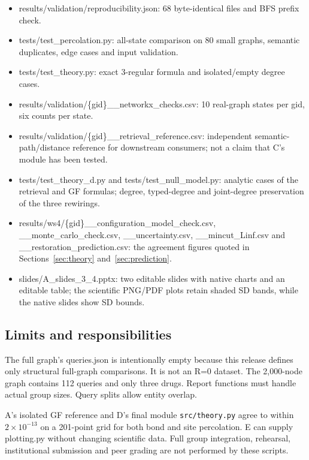 \begin{itemize}
\tightlist
\item
  results/validation/reproducibility.json: 68 byte-identical files and
  BFS prefix check.
\item
  tests/test\_percolation.py: all-state comparison on 80 small graphs,
  semantic duplicates, edge cases and input validation.
\item
  tests/test\_theory.py: exact 3-regular formula and isolated/empty
  degree cases.
\item
  results/validation/\{gid\}\_\_networkx\_checks.csv: 10 real-graph
  states per gid, six counts per state.
\item
  results/validation/\{gid\}\_\_retrieval\_reference.csv: independent
  semantic-path/distance reference for downstream consumers; not a claim
  that C's module has been tested.
\item
  tests/test\_theory\_d.py and tests/test\_null\_model.py: analytic cases of
  the retrieval and GF formulas; degree, typed-degree and joint-degree
  preservation of the three rewirings.
\item
  results/ws4/\{gid\}\_\_configuration\_model\_check.csv,
  \_\_monte\_carlo\_check.csv, \_\_uncertainty.csv,
  \_\_mincut\_Linf.csv and \_\_restoration\_prediction.csv: the
  agreement figures quoted in Sections~\ref{sec:theory} and~\ref{sec:prediction}.
\item
  slides/A\_slides\_3\_4.pptx: two editable slides with native charts
  and an editable table; the scientific PNG/PDF plots retain shaded SD
  bands, while the native slides show SD bounds.
\end{itemize}

\subsection{Limits and
responsibilities}\label{limits-and-responsibilities}

The full graph's queries.json is intentionally empty because this
release defines only structural full-graph comparisons. It is not an R=0
dataset. The 2,000-node graph contains 112 queries and only three drugs.
Report functions must handle actual group sizes. Query splits allow
entity overlap.

A's isolated GF reference and D's final module \texttt{src/theory.py} agree
to within $2\times10^{-13}$ on a 201-point grid for both bond and site
percolation. E
can supply plotting.py without changing scientific data. Full group
integration, rehearsal, institutional submission and peer grading are
not performed by these scripts.
